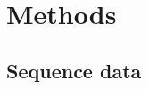 \documentclass[9pt,lineno]{elife}
\def\gdc#1{\textcolor{blue}{[#1]}}
\def\lmc#1{\textcolor{green}{[#1]}}
\begin{document}


\newpage

\section*{Methods}
\subsection*{Sequence data}
\end{document}
